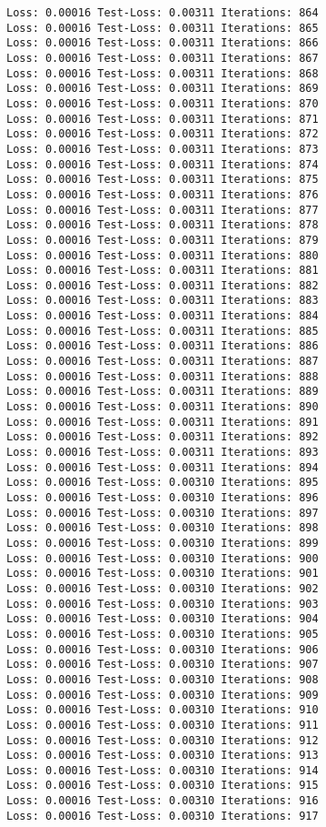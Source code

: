 \documentclass[11pt]{article}
\begin{document}
\begin{Verbatim}[commandchars=\\\{\}]
Loss: 0.00016 Test-Loss: 0.00311 Iterations: 864
Loss: 0.00016 Test-Loss: 0.00311 Iterations: 865
Loss: 0.00016 Test-Loss: 0.00311 Iterations: 866
Loss: 0.00016 Test-Loss: 0.00311 Iterations: 867
Loss: 0.00016 Test-Loss: 0.00311 Iterations: 868
Loss: 0.00016 Test-Loss: 0.00311 Iterations: 869
Loss: 0.00016 Test-Loss: 0.00311 Iterations: 870
Loss: 0.00016 Test-Loss: 0.00311 Iterations: 871
Loss: 0.00016 Test-Loss: 0.00311 Iterations: 872
Loss: 0.00016 Test-Loss: 0.00311 Iterations: 873
Loss: 0.00016 Test-Loss: 0.00311 Iterations: 874
Loss: 0.00016 Test-Loss: 0.00311 Iterations: 875
Loss: 0.00016 Test-Loss: 0.00311 Iterations: 876
Loss: 0.00016 Test-Loss: 0.00311 Iterations: 877
Loss: 0.00016 Test-Loss: 0.00311 Iterations: 878
Loss: 0.00016 Test-Loss: 0.00311 Iterations: 879
Loss: 0.00016 Test-Loss: 0.00311 Iterations: 880
Loss: 0.00016 Test-Loss: 0.00311 Iterations: 881
Loss: 0.00016 Test-Loss: 0.00311 Iterations: 882
Loss: 0.00016 Test-Loss: 0.00311 Iterations: 883
Loss: 0.00016 Test-Loss: 0.00311 Iterations: 884
Loss: 0.00016 Test-Loss: 0.00311 Iterations: 885
Loss: 0.00016 Test-Loss: 0.00311 Iterations: 886
Loss: 0.00016 Test-Loss: 0.00311 Iterations: 887
Loss: 0.00016 Test-Loss: 0.00311 Iterations: 888
Loss: 0.00016 Test-Loss: 0.00311 Iterations: 889
Loss: 0.00016 Test-Loss: 0.00311 Iterations: 890
Loss: 0.00016 Test-Loss: 0.00311 Iterations: 891
Loss: 0.00016 Test-Loss: 0.00311 Iterations: 892
Loss: 0.00016 Test-Loss: 0.00311 Iterations: 893
Loss: 0.00016 Test-Loss: 0.00311 Iterations: 894
Loss: 0.00016 Test-Loss: 0.00310 Iterations: 895
Loss: 0.00016 Test-Loss: 0.00310 Iterations: 896
Loss: 0.00016 Test-Loss: 0.00310 Iterations: 897
Loss: 0.00016 Test-Loss: 0.00310 Iterations: 898
Loss: 0.00016 Test-Loss: 0.00310 Iterations: 899
Loss: 0.00016 Test-Loss: 0.00310 Iterations: 900
Loss: 0.00016 Test-Loss: 0.00310 Iterations: 901
Loss: 0.00016 Test-Loss: 0.00310 Iterations: 902
Loss: 0.00016 Test-Loss: 0.00310 Iterations: 903
Loss: 0.00016 Test-Loss: 0.00310 Iterations: 904
Loss: 0.00016 Test-Loss: 0.00310 Iterations: 905
Loss: 0.00016 Test-Loss: 0.00310 Iterations: 906
Loss: 0.00016 Test-Loss: 0.00310 Iterations: 907
Loss: 0.00016 Test-Loss: 0.00310 Iterations: 908
Loss: 0.00016 Test-Loss: 0.00310 Iterations: 909
Loss: 0.00016 Test-Loss: 0.00310 Iterations: 910
Loss: 0.00016 Test-Loss: 0.00310 Iterations: 911
Loss: 0.00016 Test-Loss: 0.00310 Iterations: 912
Loss: 0.00016 Test-Loss: 0.00310 Iterations: 913
Loss: 0.00016 Test-Loss: 0.00310 Iterations: 914
Loss: 0.00016 Test-Loss: 0.00310 Iterations: 915
Loss: 0.00016 Test-Loss: 0.00310 Iterations: 916
Loss: 0.00016 Test-Loss: 0.00310 Iterations: 917

\end{Verbatim}
\end{document}

